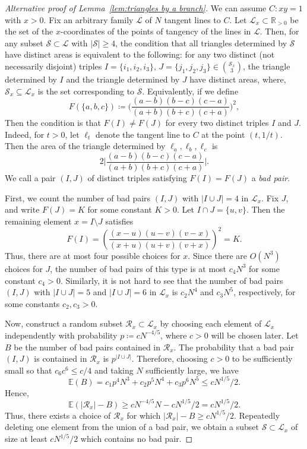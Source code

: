 \documentclass[a4paper,oneside,10pt]{amsart}
\begin{document}
\begin{proof}[Alternative proof of Lemma~\ref{lem:triangles by a branch}]
We can assume $C \colon xy=1$ with $x>0$.
Fix an arbitrary family $\mathcal{L}$ of $N$ tangent lines to $C$.
Let $\mathcal{L}_x \subset \mathbb{R}_{>0}$ be the set of the $x$-coordinates of the points of tangency of the lines in $\mathcal{L}$.
Then, for any subset $\mathcal{S} \subset \mathcal{L}$ with $|\mathcal{S}| \geq 4$, the condition that all triangles determined by $\mathcal{S}$ have distinct areas is equivalent to the following: for any two distinct (not necessarily disjoint) triples $I=\{i_1,i_2,i_3\}, \, J=\{j_1,j_2,j_3\} \in \binom{\mathcal{S}_x}{3}$, the triangle determined by $I$ and the triangle determined by $J$ have distinct areas,
where, $\mathcal{S}_x \subseteq \mathcal{L}_x$ is the set corresponding to $\mathcal{S}$.
Equivalently, if we define
$$
F(\{a,b,c\}) \coloneqq \Big(\frac{(a-b)(b-c)(c-a)}{(a+b)(b+c)(c+a)}\Big)^2,
$$
Then the condition is that $F(I) \neq F(J)$ for every two distinct triples $I$ and $J$.
Indeed, for $t>0$, let $\ell_t$ denote the tangent line to $C$ at the point $(t,1/t)$. Then the area of the triangle determined by $\ell_a,\ell_b,\ell_c$ is
$$ 
2 \Big|\frac{(a-b)(b-c)(c-a)}{(a+b)(b+c)(c+a)}\Big|.
 $$
We call a pair $(I,J)$ of distinct triples satisfying $F(I)=F(J)$ a \textit{bad pair}.

First, we count the number of bad pairs $(I,J)$ with $|I\cup J|=4$ in $\mathcal{L}_x$.
Fix $J$, and write $F(J)=K$ for some constant $K>0$. Let
$
I\cap J= \{u,v\}.
$
Then the remaining element ${x}=I\setminus J$ satisfies
$$
F(I)=\left(\frac{(x-u)(u-v)(v-x)}{(x+u)(u+v)(v+x)}\right)^2=K.
$$
Thus, there are at most four possible choices for $x$. Since there are $O(N^3)$ choices for $J$, the number of bad pairs of this type is at most $c_4 N^3$ for some constant $c_4>0$.
Similarly, it is not hard to see that the number of bad pairs $(I,J)$ with $|I\cup J|=5$ and $|I\cup J|=6$ in $\mathcal{L}_x$ is $c_2 N^4$ and $c_3 N^5$, respectively, for some constants $c_2, c_3 >0$.

Now, construct a random subset $\mathcal{R}_x\subset \mathcal{L}_x$ by choosing each element of $\mathcal{L}_x$ independently with probability $p\coloneqq cN^{-4/5}$, where $c>0$ will be chosen later.
Let $B$ be the number of bad pairs contained in $\mathcal{R}_x$.
The probability that a bad pair $(I,J)$ is contained in $\mathcal{R}_x$ is $p^{|I\cup J|}$.
Therefore, choosing $c>0$ to be sufficiently small so that $c_6 c^6 \leq c/4$ and taking $N$ sufficiently large, we have
$$
\mathbb{E}(B)= c_1 p^4 N^3 + c_2 p^5 N^4 + c_3 p^6 N^5 \leq cN^{1/5}/2.
$$
Hence,
$$
\mathbb{E}(|\mathcal{R}_x|-B) \geq cN^{-4/5} N-c N^{1/5}/2=cN^{1/5}/2.
$$
Thus, there exists a choice of $\mathcal{R}_x$ for which
$
|\mathcal{R}_x|-B \geq cN^{1/5}/2.
$
Repeatedly deleting one element from the union of a bad pair, we
obtain a subset $\mathcal{S}\subset \mathcal{L}_x$ of size at least $cN^{1/5}/2$ which contains no bad pair.
\end{proof}
\end{document}
